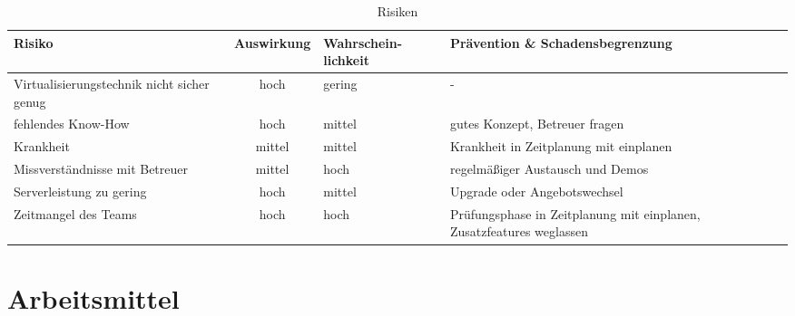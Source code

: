 \documentclass[
	pdftex,
	fontsize=12pt,          %
	DIV10,                  %
	ngerman,                %
	paper=a4,               %
	twoside=false,          %
	titlepage,              %
	parskip=half,           %
	headings=normal,        %
	listof=nochaptergap,  %
	bibliography=totoc, %
	index=totoc,            %
	captions=tableheading,  %
	final                 %
]{scrreprt}
\begin{document}
\begin{table}[H]
\begin{tabular}{|p{3cm}|c|p{3cm}|p{5cm}|}
	\hline
	\rowcolor{lightgray}\textbf{Risiko} & \textbf{Auswirkung} & \textbf{Wahrschein-lichkeit} & \textbf{Prävention \& Schadensbegrenzung} \\\hline
	\rowcolor{green}Virtualisierungstechnik nicht sicher genug & hoch & gering & - \\\hline
	\rowcolor{yellow}fehlendes Know-How & hoch & mittel & gutes Konzept, Betreuer fragen \\\hline
	\rowcolor{yellow}Krankheit & mittel & mittel & Krankheit in Zeitplanung mit einplanen \\\hline
	\rowcolor{red}Missverständnisse mit Betreuer & mittel & hoch & regelmäßiger Austausch und Demos \\\hline
	\rowcolor{red}Serverleistung zu gering & hoch & mittel & Upgrade oder Angebotswechsel \\\hline
	\rowcolor{red}Zeitmangel des Teams & hoch & hoch & Prüfungsphase in Zeitplanung mit einplanen, Zusatzfeatures weglassen \\\hline
\end{tabular}
	\caption{Risiken}
	\label{tab:risiken}
\end{table}


\section{Arbeitsmittel}
\end{document}
